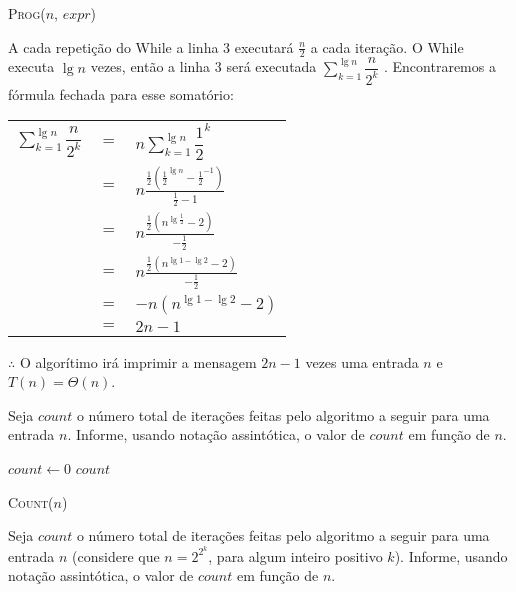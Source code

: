 \documentclass[a4paper]{exam}
\DeclarePairedDelimiter{\floor}{\lfloor}{\rfloor}
\begin{document}
\begin{questions}
  \begin{algorithm}[H]
    \NoCaptionOfAlgo
    \DontPrintSemicolon

    \caption{\textsc{Prog}($n$, $expr$)}
  \end{algorithm}
  \begin{solution}
    A cada repetição do While a linha 3 executará $\frac{n}{2}$ a cada iteração. O While executa $\lg n$ vezes,
    então a linha 3 será executada $\displaystyle\sum_{k=1}^{\lg n} \dfrac{n}{2^k}$ . Encontraremos a fórmula fechada
    para esse somatório:\\
    \begin{tabular}{lll}
      $ \displaystyle\sum_{k=1}^{\lg n} \dfrac{n}{2^k} $&  $=$ &$ n\displaystyle\sum_{k=1}^{\lg n} {\dfrac{1}{2}}^k $ \\
      {}& $=$ &$ n\frac{\frac{1}{2}({\frac{1}{2}}^{\lg n} - {\frac{1}{2}}^{-1})}{\frac{1}{2} - 1}$ \\
      {}& $=$ &$ n\frac{\frac{1}{2}({n}^{\lg {\frac{1}{2}}} - {2})}{-\frac{1}{2}}$ \\
      {}& $=$ &$ n\frac{\frac{1}{2}({n}^{\lg 1 - \lg 2} - {2})}{-\frac{1}{2}}$ \\
      {}& $=$ &$ -n({n^{{\lg 1} - {\lg 2}}} - 2)$ \\
      {}& $=$ &$ 2n -1$ \\
    \end{tabular}

    $\therefore$ O algorítimo irá imprimir a mensagem $2n-1$ vezes uma entrada $n$ e $T(n)= \Theta(n)$.
  \end{solution}
  \question Seja $count$ o número total de iterações feitas pelo
  algoritmo a seguir para uma entrada $n$. Informe, usando
  notação assintótica, o valor de $count$ em função de $n$.

  \begin{algorithm}[H]
    \NoCaptionOfAlgo
    \DontPrintSemicolon

    $count \gets 0$\;
    \Return $count$\;
    \caption{\textsc{Count}($n$)}
  \end{algorithm}
  \question Seja $count$ o número total de iterações feitas pelo
  algoritmo a seguir para uma entrada $n$ (considere que $n = 2^{2^{k}}$,
  para algum inteiro positivo $k$). Informe, usando
  notação assintótica, o valor de $count$ em função de $n$.
  

\end{questions}
\end{document}
